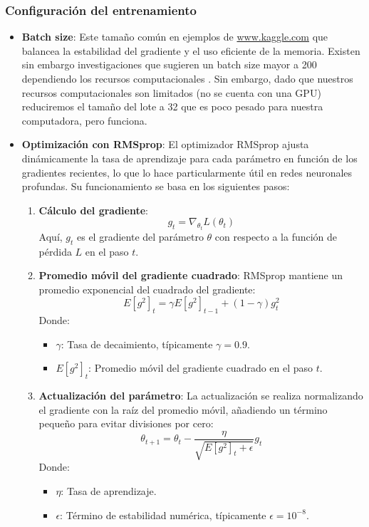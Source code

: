 \documentclass[../main.tex]{subfiles}
\begin{document}
\subsubsection{Configuración del entrenamiento}

\begin{itemize}
  \item \textbf{Batch size}:
  Este tamaño común en ejemplos de \url{www.kaggle.com} que balancea la estabilidad del gradiente y el uso eficiente de la memoria. Existen sin embargo investigaciones que sugieren un batch size mayor a 200 dependiendo los recursos computacionales \cite{radiuk2017impact}. Sin embargo, dado que nuestros recursos computacionales son limitados (no se cuenta con una GPU) reduciremos el tamaño del lote a 32 que es poco pesado para nuestra computadora, pero funciona.

  \item \textbf{Optimización con RMSprop}:
  El optimizador RMSprop ajusta dinámicamente la tasa de aprendizaje para cada parámetro en función de los gradientes recientes, lo que lo hace particularmente útil en redes neuronales profundas. Su funcionamiento se basa en los siguientes pasos:

  \begin{enumerate}
  \item \textbf{Cálculo del gradiente}:
     \[
     g_t = \nabla_{\theta_t} L(\theta_t)
     \]
     Aquí, \( g_t \) es el gradiente del parámetro \( \theta \) con respecto a la función de pérdida \( L \) en el paso \( t \).
  
  \item \textbf{Promedio móvil del gradiente cuadrado}:
     RMSprop mantiene un promedio exponencial del cuadrado del gradiente:
     \[
     E[g^2]_t = \gamma E[g^2]_{t-1} + (1 - \gamma) g_t^2
     \]
     Donde:
    \begin{itemize}
      \item \( \gamma \): Tasa de decaimiento, típicamente \( \gamma = 0.9 \).
      \item \( E[g^2]_t \): Promedio móvil del gradiente cuadrado en el paso \( t \).
    \end{itemize}
  
  \item \textbf{Actualización del parámetro}:
    La actualización se realiza normalizando el gradiente con la raíz del promedio móvil, añadiendo un término pequeño para evitar divisiones por cero:
    \[
    \theta_{t+1} = \theta_t - \frac{\eta}{\sqrt{E[g^2]_t + \epsilon}} g_t
    \]
    Donde:
    \begin{itemize}
      \item \( \eta \): Tasa de aprendizaje.
      \item \( \epsilon \): Término de estabilidad numérica, típicamente \( \epsilon = 10^{-8} \).
    \end{itemize}


\end{enumerate}
\end{itemize}
\end{document}
